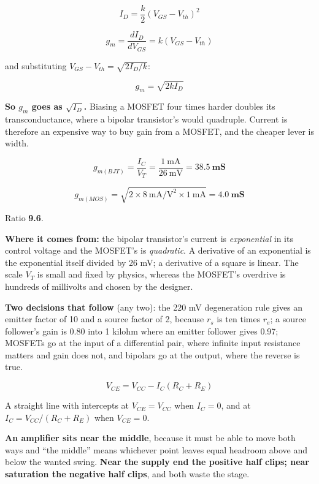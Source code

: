 
\[
  I_D = \frac{k}{2}(V_{GS} - V_{th})^2
\]

\[
  g_m = \frac{dI_D}{dV_{GS}} = k(V_{GS} - V_{th})
\]

and substituting $V_{GS} - V_{th} = \sqrt{2I_D/k}$:

\[
  \boxed{g_m = \sqrt{2 k I_D}}
\]

\textbf{So $g_m$ goes as $\sqrt{I_D}$.} Biasing a MOSFET four times harder doubles its transconductance, where a bipolar transistor's would quadruple. Current is therefore an expensive way to buy gain from a MOSFET, and the cheaper lever is width.


\[
  g_{m(BJT)} = \frac{I_C}{V_T} = \frac{1\ \text{mA}}{26\ \text{mV}} = \mathbf{38.5\ \text{mS}}
\]

\[
  g_{m(MOS)} = \sqrt{2 \times 8\ \text{mA/V}^2 \times 1\ \text{mA}} = \mathbf{4.0\ \text{mS}}
\]

Ratio \textbf{9.6}.

\textbf{Where it comes from:} the bipolar transistor's current is \emph{exponential} in its control voltage and the MOSFET's is \emph{quadratic}. A derivative of an exponential is the exponential itself divided by 26 mV; a derivative of a square is linear. The scale $V_T$ is small and fixed by physics, whereas the MOSFET's overdrive is hundreds of millivolts and chosen by the designer.

\textbf{Two decisions that follow} (any two): the 220 mV degeneration rule gives an emitter factor of 10 and a source factor of 2, because $r_s$ is ten times $r_e$; a source follower's gain is 0.80 into 1 kilohm where an emitter follower gives 0.97; MOSFETs go at the input of a differential pair, where infinite input resistance matters and gain does not, and bipolars go at the output, where the reverse is true.



\[
  V_{CE} = V_{CC} - I_C(R_C + R_E)
\]

A straight line with intercepts at $V_{CE} = V_{CC}$ when $I_C = 0$, and at $I_C = V_{CC}/(R_C + R_E)$ when $V_{CE} = 0$.

\textbf{An amplifier sits near the middle}, because it must be able to move both ways and ``the middle'' means whichever point leaves equal headroom above and below the wanted swing. \textbf{Near the supply end the positive half clips; near saturation the negative half clips}, and both waste the stage.

